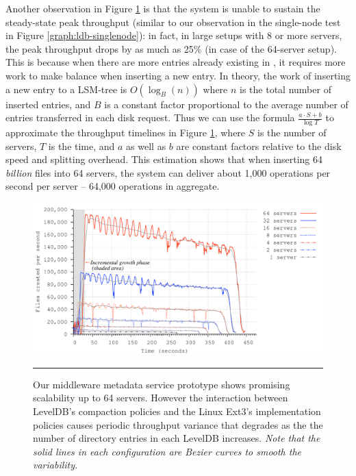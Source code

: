Another observation in Figure \ref{graph:ldb-scaling} is that the system is
unable to sustain the steady-state peak throughput (similar to our observation
in the single-node test in Figure \ref{graph:ldb-singlenode}): 
in fact, in large setups with 8 or more servers, 
the peak throughput drops by as much as 25\% (in case of the 64-server setup).
This is because when there are more entries already existing in \ldb, 
it requires more work to make \ldb balance when inserting a new entry.
In theory, the work of inserting a new entry to a LSM-tree is $O(\log_{B}(n))$
where $n$ is the total number of inserted entries, and $B$ is a constant factor
proportional to the average number of entries transferred in each disk request. 
Thus we can use the formula $\frac{a\cdot S+b}{\log{T}}$ to approximate the 
throughput timelines in Figure \ref{graph:ldb-scaling}, where $S$ is the number 
of servers, $T$ is the time, and $a$ as well as $b$ are constant factors relative 
to the disk speed and splitting overhead.
This estimation shows that when inserting 64 \textit{billion} files into 64 
servers, the system can deliver about 1,000 operations per second per server -- 
64,000 operations in aggregate. 

\begin{figure}[t]  %
\centerline{\includegraphics[scale=0.33]{./figs/ldb_insertrate}}
\caption{
{\small
Our middleware metadata service prototype shows promising scalability
up to 64 servers. However the interaction between LevelDB's compaction policies and 
the Linux Ext3's implementation policies causes periodic throughput variance
that degrades as the the number of directory entries in each LevelDB
increases. \textit{Note that the solid lines in each configuration are Bezier
curves to smooth the variability.}
}
}
\vspace{15pt}
\hrule 
\label{graph:ldb-scaling}
\end{figure}       %

